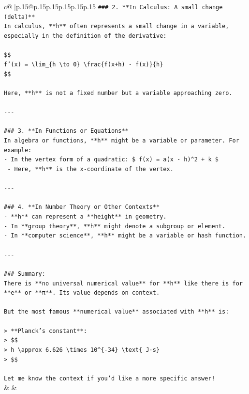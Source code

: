 \documentclass{article}
\begin{document}
{\begin{supertabular}{c@{$\;$}|p{.15\linewidth}@{}p{.15\linewidth}p{.15\linewidth}p{.15\linewidth}p{.15\linewidth}p{.15\linewidth}}
{{{\texttt{\#\#\# 2. **In Calculus: A small change (delta)**} \\
\texttt{In calculus, **h** often represents a small change in a variable, especially in the definition of the derivative:} \\
\\ 
\texttt{\$\$} \\
\texttt{f'(x) = \textbackslash{}lim\_\{h \textbackslash{}to 0\} \textbackslash{}frac\{f(x+h) {-} f(x)\}\{h\}} \\
\texttt{\$\$} \\
\\ 
\texttt{Here, **h** is not a fixed number but a variable approaching zero.} \\
\\ 
\texttt{{-}{-}{-}} \\
\\ 
\texttt{\#\#\# 3. **In Functions or Equations**} \\
\texttt{In algebra or functions, **h** might be a variable or parameter. For example:} \\
\texttt{{-} In the vertex form of a quadratic: \$ f(x) = a(x {-} h)\^{}2 + k \$} \\
\texttt{  {-} Here, **h** is the x{-}coordinate of the vertex.} \\
\\ 
\texttt{{-}{-}{-}} \\
\\ 
\texttt{\#\#\# 4. **In Number Theory or Other Contexts**} \\
\texttt{{-} **h** can represent a **height** in geometry.} \\
\texttt{{-} In **group theory**, **h** might denote a subgroup or element.} \\
\texttt{{-} In **computer science**, **h** might be a variable or hash function.} \\
\\ 
\texttt{{-}{-}{-}} \\
\\ 
\texttt{\#\#\# Summary:} \\
\texttt{There is **no universal numerical value** for **h** like there is for **e** or **π**. Its value depends on context.} \\
\\ 
\texttt{But the most famous **numerical value** associated with **h** is:} \\
\\ 
\texttt{> **Planck's constant**:  } \\
\texttt{> \$\$} \\
\texttt{> h \textbackslash{}approx 6.626 \textbackslash{}times 10\^{}\{{-}34\} \textbackslash{}text\{ J·s\}} \\
\texttt{> \$\$} \\
\\ 
\texttt{Let me know the context if you'd like a more specific answer!} \\
            }
        }
    }
    & & \\ \\


\end{supertabular}}
\end{document}
